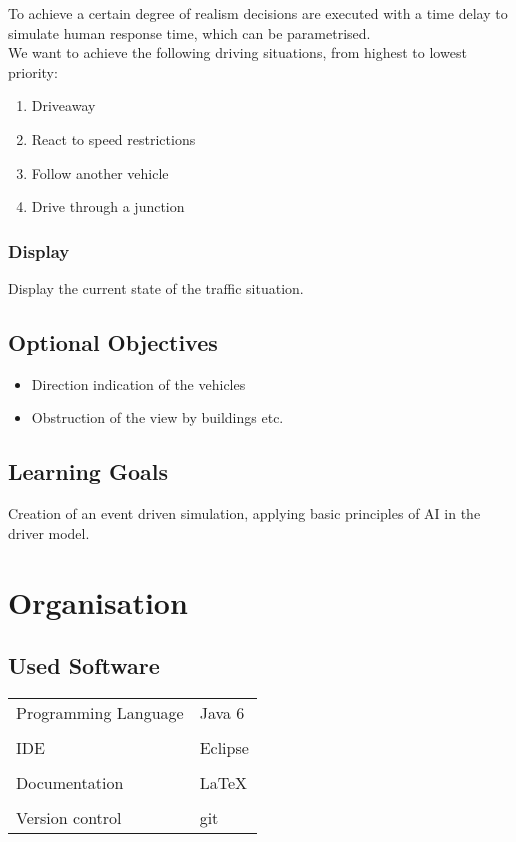\documentclass[a4paper,10pt,titlepage]{article}
\begin{document}
 To achieve a certain degree of realism decisions are executed with a time delay to simulate human response time,
 which can be parametrised.\\

 We want to achieve the following driving situations, from highest to lowest priority:
 \begin{enumerate}
	\item Driveaway
	\item React to speed restrictions
	\item Follow another vehicle
	\item Drive through a junction
 \end{enumerate}

\subsubsection{Display}

Display the current state of the traffic situation. 
\newpage

\subsection{Optional Objectives}
\begin{itemize}
 \item Direction indication of the vehicles
 \item Obstruction of the view by buildings etc. 
\end{itemize}

\subsection{Learning Goals}

Creation of an event driven simulation, applying basic principles of AI in the driver model.


\section{Organisation}

\subsection{Used Software}
\begin{tabular}{ll}
Programming Language & Java 6 \\
& \\
IDE & Eclipse \\
& \\
Documentation & \LaTeX \\
& \\
Version control & git \\
\end{tabular}
\end{document}
